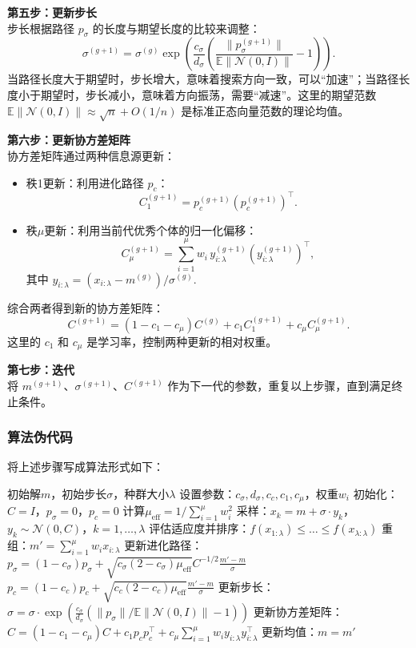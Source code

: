 \documentclass[lang=cn,zihao=-4,a4paper,fontset=windows]{beautybook}
\begin{document}
\textbf{第五步：更新步长} \\
步长根据路径 \( p_\sigma \) 的长度与期望长度的比较来调整：
\[
\sigma^{(g+1)} = \sigma^{(g)} \exp\left( \frac{c_\sigma}{d_\sigma} \left( \frac{\|p_\sigma^{(g+1)}\|}{\mathbb{E}\|\mathcal{N}(0,I)\|} - 1 \right) \right).
\]
当路径长度大于期望时，步长增大，意味着搜索方向一致，可以“加速”；当路径长度小于期望时，步长减小，意味着方向振荡，需要“减速”。这里的期望范数 \( \mathbb{E}\|\mathcal{N}(0,I)\| \approx \sqrt{n} + O(1/n) \) 是标准正态向量范数的理论均值。

\textbf{第六步：更新协方差矩阵} \\
协方差矩阵通过两种信息源更新：
\begin{itemize}
    \item 秩1更新：利用进化路径 \( p_c \)：
    \[
    C_1^{(g+1)} = p_c^{(g+1)} (p_c^{(g+1)})^\top.
    \]
    \item 秩$\mu$更新：利用当前代优秀个体的归一化偏移：
    \[
    C_\mu^{(g+1)} = \sum_{i=1}^{\mu} w_i \, y_{i:\lambda}^{(g+1)} (y_{i:\lambda}^{(g+1)})^\top,
    \]
    其中 \( y_{i:\lambda} = (x_{i:\lambda} - m^{(g)}) / \sigma^{(g)} \).
\end{itemize}
综合两者得到新的协方差矩阵：
\[
C^{(g+1)} = (1 - c_1 - c_\mu) C^{(g)} + c_1 C_1^{(g+1)} + c_\mu C_\mu^{(g+1)}.
\]
这里的 \( c_1 \) 和 \( c_\mu \) 是学习率，控制两种更新的相对权重。

\textbf{第七步：迭代} \\
将 \( m^{(g+1)} \)、\( \sigma^{(g+1)} \)、\( C^{(g+1)} \) 作为下一代的参数，重复以上步骤，直到满足终止条件。

\subsubsection{算法伪代码}

将上述步骤写成算法形式如下：

\begin{algorithm}[H]
\caption{协方差矩阵自适应进化策略（CMA-ES）}
\begin{algorithmic}[1]
\REQUIRE 初始解$m$，初始步长$\sigma$，种群大小$\lambda$
\STATE 设置参数：$c_\sigma, d_\sigma, c_c, c_1, c_\mu$，权重$w_i$
\STATE 初始化：$C = I$，$p_\sigma = 0$，$p_c = 0$
\STATE 计算$\mu_{\text{eff}} = 1/\sum_{i=1}^{\mu} w_i^2$
    \STATE 采样：$x_k = m + \sigma \cdot y_k$，$y_k \sim \mathcal{N}(0, C)$，$k=1,\dots,\lambda$
    \STATE 评估适应度并排序：$f(x_{1:\lambda}) \leq \dots \leq f(x_{\lambda:\lambda})$
    \STATE 重组：$m' = \sum_{i=1}^{\mu} w_i x_{i:\lambda}$
    \STATE 更新进化路径：
    \STATE \quad $p_\sigma = (1-c_\sigma)p_\sigma + \sqrt{c_\sigma(2-c_\sigma)\mu_{\text{eff}}} C^{-1/2} \frac{m'-m}{\sigma}$
    \STATE \quad $p_c = (1-c_c)p_c + \sqrt{c_c(2-c_c)\mu_{\text{eff}}} \frac{m'-m}{\sigma}$
    \STATE 更新步长：$\sigma = \sigma \cdot \exp\left(\frac{c_\sigma}{d_\sigma}(\|p_\sigma\|/\mathbb{E}\|\mathcal{N}(0,I)\| - 1)\right)$
    \STATE 更新协方差矩阵：
    \STATE \quad $C = (1-c_1-c_\mu)C + c_1 p_c p_c^\top + c_\mu \sum_{i=1}^{\mu} w_i y_{i:\lambda} y_{i:\lambda}^\top$
    \STATE 更新均值：$m = m'$
\ENDFOR
\end{algorithmic}
\end{algorithm}
\end{document}
